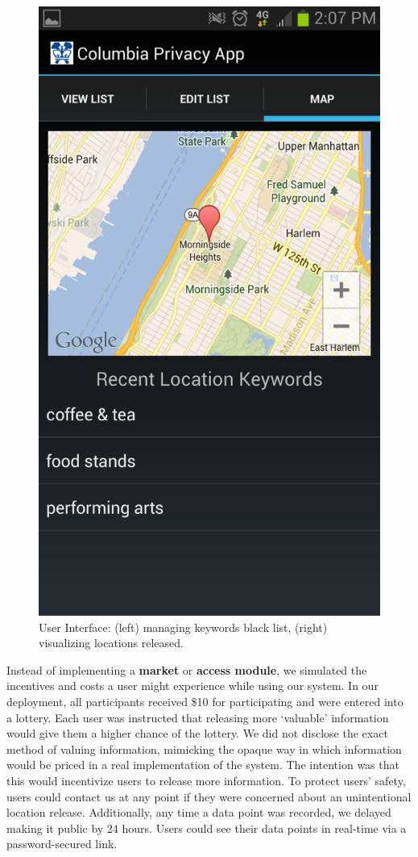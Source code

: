 \begin{figure}
  \includegraphics[width=0.75\linewidth]{fig/keyword/screenshot_map.pdf}
\endminipage
\caption{User Interface: (left) managing keywords black list, (right) visualizing locations released.}
\end{figure}

Instead of implementing a \textbf{market} or \textbf{access module}, we simulated the incentives and costs a user might experience while using our system. 
In our deployment, all participants received \$10 for participating and were entered into a lottery.
Each user was instructed that releasing more `valuable' information would give them a higher chance of the lottery.
We did not disclose the exact method of valuing information, mimicking the opaque way in which information would be priced in a real implementation of the system. 
The intention was that this would incentivize users to release more information.
To protect users' safety, users could contact us at any point if they were concerned about an unintentional location release. 
Additionally, any time a data point was recorded, we delayed making it public by 24 hours. 
Users could see their data points in real-time via a password-secured link.


